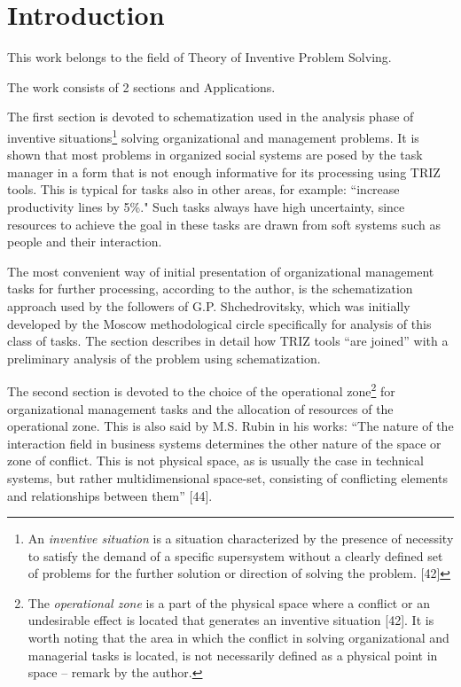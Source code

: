 \chapter{Introduction}
This work belongs to the field of Theory of Inventive Problem Solving.

The work consists of 2 sections and Applications.

The first section is devoted to schematization used in the analysis phase of
inventive situations\footnote{An \emph{inventive situation} is a situation
  characterized by the presence of necessity to satisfy the demand of a
  specific supersystem without a clearly defined set of problems for the
  further solution or direction of solving the problem. [42]} solving
organizational and management problems. It is shown that most problems in
organized social systems are posed by the task manager in a form that is not
enough informative for its processing using TRIZ tools.  This is typical for
tasks also in other areas, for example: “increase productivity lines by 5\%."
Such tasks always have high uncertainty, since resources to achieve the goal
in these tasks are drawn from soft systems such as people and their
interaction.

The most convenient way of initial presentation of organizational management
tasks for further processing, according to the author, is the schematization
approach used by the followers of G.P. Shchedrovitsky, which was initially
developed by the Moscow methodological circle specifically for analysis of
this class of tasks. The section describes in detail how TRIZ tools “are
joined” with a preliminary analysis of the problem using schematization.

The second section is devoted to the choice of the operational
zone\footnote{The \emph{operational zone} is a part of the physical space
  where a conflict or an undesirable effect is located that generates an
  inventive situation [42]. It is worth noting that the area in which the
  conflict in solving organizational and managerial tasks is located, is not
  necessarily defined as a physical point in space -- remark by the author.}
for organizational management tasks and the allocation of resources of the
operational zone. This is also said by M.S.  Rubin in his works: “The nature
of the interaction field in business systems determines the other nature of
the space or zone of conflict. This is not physical space, as is usually the
case in technical systems, but rather multidimensional space-set, consisting
of conflicting elements and relationships between them” [44].

